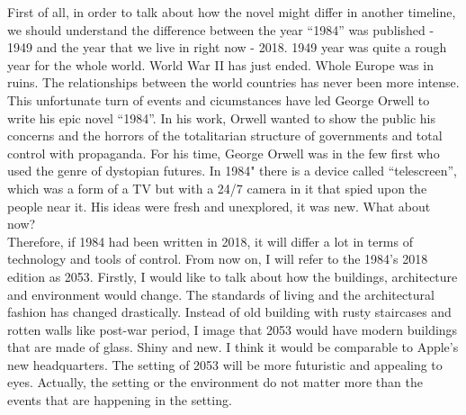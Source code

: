 \documentclass[a4paper,12pt]{article}
\begin{document}
First of all, in order to talk about how the novel might differ in another timeline, we should understand the difference between the year ``1984'' was published - 1949 and the year that we live in right now - 2018. 1949 year was quite a rough year for the whole world. World War II has just ended. Whole Europe was in ruins. The relationships between the world countries has never been more intense. This unfortunate turn of events and cicumstances have led George Orwell to write his epic novel ``1984''. In his work, Orwell wanted to show the public his concerns and the horrors of the totalitarian structure of governments and total control with propaganda. For his time, George Orwell was in the few first who used the genre of dystopian futures. In 1984" there is a device called ``telescreen'', which was a form of a TV but with a 24/7 camera in it that spied upon the people near it. His ideas were fresh and unexplored, it was new. What about now?\\

Therefore, if 1984 had been written in 2018, it will differ a lot in terms of technology and tools of control. From now on, I will refer to the 1984's 2018 edition as 2053. Firstly, I would like to talk about how the buildings, architecture and environment would change. The standards of living and the architectural fashion has changed drastically. Instead of old building with rusty staircases and rotten walls like post-war period, I image that 2053 would have modern buildings that are made of glass. Shiny and new. I think it would be comparable to Apple's new headquarters.\cite{apple} The setting of 2053 will be more futuristic and appealing to eyes. Actually, the setting or the environment do not matter more than the events that are happening in the setting. \\
 
\end{document}
